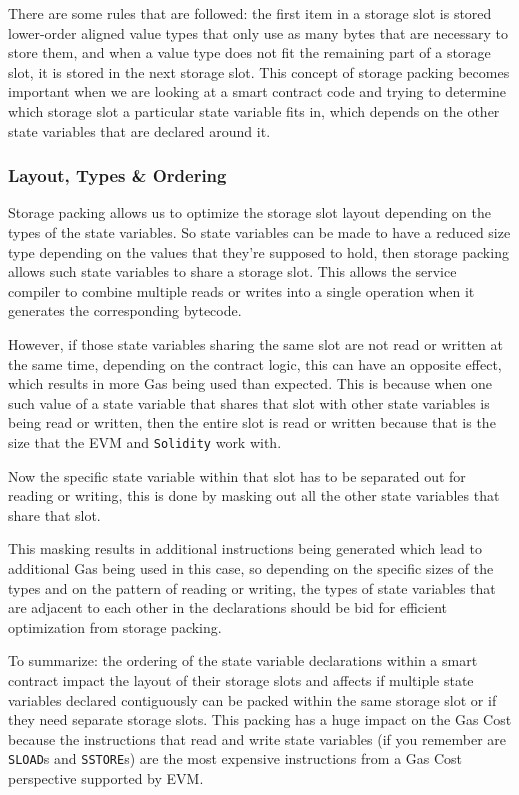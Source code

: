 There are some rules that are followed: the first item in a storage slot
is stored lower-order aligned value types that only use as many bytes
that are necessary to store them, and when a value type does not fit the
remaining part of a storage slot, it is stored in the next storage slot.
This concept of storage packing becomes important when we are looking at
a smart contract code and trying to determine which storage slot a
particular state variable fits in, which depends on the other state
variables that are declared around it.

\subsubsection{Layout, Types \& Ordering}\label{layout-types-ordering}

Storage packing allows us to optimize the storage slot layout depending
on the types of the state variables. So state variables can be made to
have a reduced size type depending on the values that they're supposed
to hold, then storage packing allows such state variables to share a
storage slot. This allows the service compiler to combine multiple reads
or writes into a single operation when it generates the corresponding
bytecode.

However, if those state variables sharing the same slot are not read or
written at the same time, depending on the contract logic, this can have
an opposite effect, which results in more Gas being used than expected.
This is because when one such value of a state variable that shares that
slot with other state variables is being read or written, then the
entire slot is read or written because that is the size that the EVM and
\texttt{Solidity} work with.

Now the specific state variable within that slot has to be separated out
for reading or writing, this is done by masking out all the other state
variables that share that slot.

This masking results in additional instructions being generated which
lead to additional Gas being used in this case, so depending on the
specific sizes of the types and on the pattern of reading or writing,
the types of state variables that are adjacent to each other in the
declarations should be bid for efficient optimization from storage
packing.

To summarize: the ordering of the state variable declarations within a
smart contract impact the layout of their storage slots and affects if
multiple state variables declared contiguously can be packed within the
same storage slot or if they need separate storage slots. This packing
has a huge impact on the Gas Cost because the instructions that read and
write state variables (if you remember are \texttt{SLOAD}s and
\texttt{SSTORE}s) are the most expensive instructions from a Gas Cost
perspective supported by EVM.

